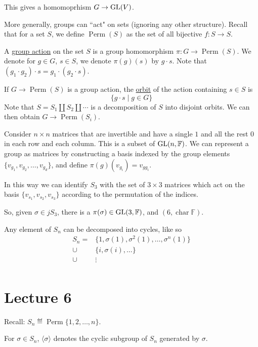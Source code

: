 \documentclass[x11names,reqno,14pt]{extarticle}
\DeclareMathOperator{\Perm}{Perm}
\begin{document}
This gives a homomoprhism $G\to {\mathrm{GL}}(V)$. 

More generally, groups can ``act" on sets (ignoring any other structure). Recall that for a set $S$, we define $\operatorname{Perm}(S)$ as the set of all bijective $f:S\to S$. 


A \underline{group action} on the set $S$ is a group homomorphism $\pi:G\to\operatorname{Perm}(S)$. We denote for $g \in G$, $s \in S$, we denote $\pi(g)(s)$ by $g\cdot s$. Note that $(g_1\cdot g_2)\cdot s = g_1 \cdot (g_2 \cdot s)$. 


If $G\to\operatorname{Perm}(S)$ is a group action, the \underline{orbit} of the action containing $s \in S$ is 
\[
\{g\cdot s \mid g \in G\}
\]
Note that $S = S_1\coprod S_2 \coprod \cdots$ is a decomposition of $S$ into disjoint orbits. We can then obtain $G\to \operatorname{Perm}(S_i)$. 

Consider $n\times n$ matrices that are invertible and have a single $1$ and all the rest $0$ in each row and each column. This is a subset of ${\mathrm{GL}}(n, \mathbb{F})$. We can represent a group as matrices by constructing a basis indexed by the group elements $\{v_{g_1}, v_{g_2}, \dots, v_{g_d}\}$, and define $\pi(g)(v_{g_i}) = v_{gg_i}$. 

In this way we can identify $S_3$ with the set of $3\times 3$ matrices which act on the basis $\{v_{s_1}, v_{s_2}, v_{s_3}\}$ according to the permutation of the indices. 

So, given $\sigma \in jS_3$, there is a $\pi(\sigma)\in {\mathrm{GL}}(3, \mathbb{F})$, and $(6, \operatorname{char}\mathbb{F})$. 

Any element of $S_n$ can be decomposed into cycles, like so
\begin{align*}
S_n = & \{1, \sigma(1), \sigma^2(1), \dots, \sigma^n(1) \} \\
	\cup	& \{i, \sigma(i), \dots \} \\
	\cup	& \vdots \\
\end{align*}

\section*{Lecture 6}

Recall: $S_n \eqdef \Perm\{1, 2, \dots, n\}$. 

For $\sigma\in S_n$, $\langle\sigma\rangle$ denotes the cyclic subgroup of $S_n$ generated by $\sigma$.
\end{document}
